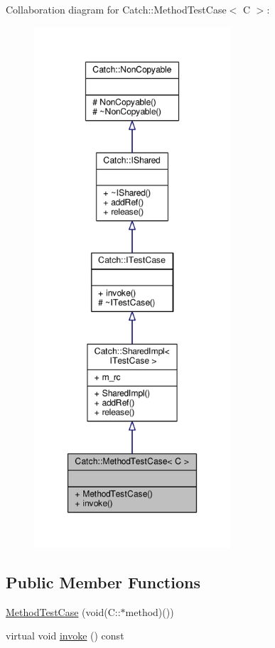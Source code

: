 Collaboration diagram for Catch\-:\-:Method\-Test\-Case$<$ C $>$\-:
\nopagebreak
\begin{figure}[H]
\begin{center}
\leavevmode
\includegraphics[height=550pt]{class_catch_1_1_method_test_case__coll__graph}
\end{center}
\end{figure}
\subsection*{Public Member Functions}
\begin{DoxyCompactItemize}
\item 
\hyperlink{class_catch_1_1_method_test_case_a7b043b85dae371358255dd9dc6582e7b}{Method\-Test\-Case} (void(C\-::$\ast$method)())
\item 
virtual void \hyperlink{class_catch_1_1_method_test_case_a39cc4b760dd71adc3f7550bc1e7eb697}{invoke} () const 
\end{DoxyCompactItemize}

